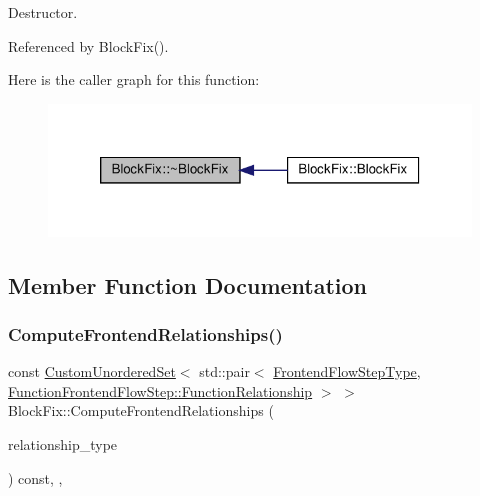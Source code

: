 Destructor. 



Referenced by Block\+Fix().

Here is the caller graph for this function\+:
\nopagebreak
\begin{figure}[H]
\begin{center}
\leavevmode
\includegraphics[width=320pt]{d0/df6/classBlockFix_a52b6f70d745c301ade9953e9b54ed426_icgraph}
\end{center}
\end{figure}


\subsection{Member Function Documentation}
\mbox{\label{classBlockFix_ab802313a53911e54b68f98498ddc3da5}} 
\subsubsection{\texorpdfstring{Compute\+Frontend\+Relationships()}{ComputeFrontendRelationships()}}
{\footnotesize\ttfamily const \hyperlink{classCustomUnorderedSet}{Custom\+Unordered\+Set}$<$ std\+::pair$<$ \hyperlink{frontend__flow__step_8hpp_afeb3716c693d2b2e4ed3e6d04c3b63bb}{Frontend\+Flow\+Step\+Type}, \hyperlink{classFrontendFlowStep_af7cf30f2023e5b99e637dc2058289ab0}{Function\+Frontend\+Flow\+Step\+::\+Function\+Relationship} $>$ $>$ Block\+Fix\+::\+Compute\+Frontend\+Relationships (\begin{DoxyParamCaption}\item[{const \hyperlink{classDesignFlowStep_a723a3baf19ff2ceb77bc13e099d0b1b7}{Design\+Flow\+Step\+::\+Relationship\+Type}}]{relationship\+\_\+type }\end{DoxyParamCaption}) const\hspace{0.3cm}{\ttfamily [override]}, {\ttfamily [private]}, {\ttfamily [virtual]}}



